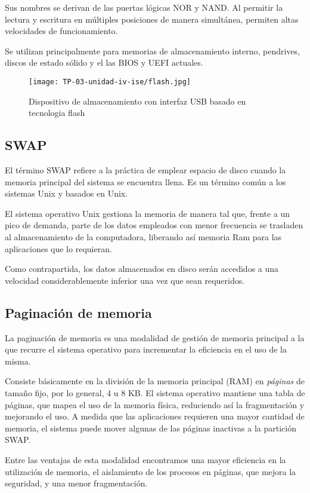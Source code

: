\documentclass[12pt]{article}
\begin{document}
Sus nombres se derivan de las puertas lógicas NOR y NAND.
Al permitir la lectura y escritura en múltiples posiciones de manera simultánea,
permiten altas velocidades de funcionamiento.

Se utilizan principalmente para memorias de almacenamiento interno,
pendrives, discos de estado sólido y el las BIOS y UEFI actuales.

\begin{figure}[h]
  \centering
  \texttt{[image: TP-03-unidad-iv-ise/flash.jpg]}
  \caption{Dispositivo de almacenamiento con interfaz USB basado en tecnologia flash}
\end{figure}

\subsection{SWAP}

El término SWAP refiere a la práctica de emplear espacio de disco cuando 
la memoria principal del sistema se encuentra llena.
Es un término común a los sistemas Unix y basados en Unix.

El sistema operativo Unix gestiona la memoria de manera tal que,
frente a un pico de demanda, 
parte de los datos empleados con menor frecuencia se trasladen al almacenamiento
de la computadora, liberando así memoria Ram para las aplicaciones que lo 
requieran.

Como contrapartida, 
los datos almacenados en disco serán accedidos a una velocidad considerablemente
inferior una vez que sean requeridos.

\subsection{Paginación de memoria}

La paginación de memoria es una modalidad de gestión de memoria principal
a la que recurre el sistema operativo para incrementar la eficiencia en el 
uso de la misma.

Consiste básicamente en la división de la memoria principal (RAM) en 
\textit{páginas} de tamaño fijo,
por lo general,
4 u 8 KB.
El sistema operativo mantiene una tabla de páginas,
que mapea el uso de la memoria física,
reduciendo así la fragmentación y mejorando el uso.
A medida que las aplicaciones requieren una mayor cantidad de memoria,
el sistema puede mover algunas de las páginas inactivas a la partición SWAP.

Entre las ventajas de esta modalidad encontramos una mayor eficiencia en 
la utilización de memoria, el aislamiento de los procesos en páginas, que 
mejora la seguridad, y una menor fragmentación.
\end{document}
